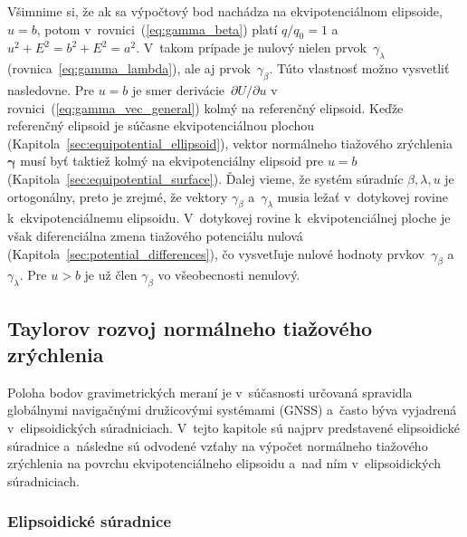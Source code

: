 \documentclass[a4paper, 12pt]{book}
\begin{document}
Všimnime si, že ak sa výpočtový bod nachádza na ekvipotenciálnom elipsoide, $u 
= b$, potom v~rovnici~(\ref{eq:gamma_beta}) platí $q \slash q_0 = 1$ a~$u^2 
+ E^2 = b^2 + E^2 = a^2$. V~takom prípade je nulový nielen 
prvok~$\gamma_\lambda$ (rovnica~\ref{eq:gamma_lambda}), ale aj 
prvok~$\gamma_\beta$.  Túto vlastnosť možno vysvetliť nasledovne.  Pre $u = b$ 
je smer derivácie~$\partial U \slash \partial u$ 
v rovnici~(\ref{eq:gamma_vec_general}) kolmý na referenčný elipsoid.  Keďže 
referenčný elipsoid je súčasne ekvipotenciálnou plochou 
(Kapitola~\ref{sec:equipotential_ellipsoid}), vektor normálneho tiažového 
zrýchlenia~$\boldsymbol \gamma$ musí byť taktiež kolmý na ekvipotenciálny 
elipsoid pre $u = b$ (Kapitola~\ref{sec:equipotential_surface}).  Ďalej vieme, 
že systém súradníc $\beta, \lambda, u$ je ortogonálny, preto je zrejmé, že 
vektory $\gamma_\beta$ a~$\gamma_\lambda$ musia ležať v~dotykovej rovine 
k~ekvipotenciálnemu elipsoidu.  V~dotykovej rovine k~ekvipotenciálnej ploche je 
však diferenciálna zmena tiažového potenciálu nulová 
(Kapitola~\ref{sec:potential_differences}), čo vysvetľuje nulové hodnoty 
prvkov~$\gamma_\beta$ a~$\gamma_\lambda$.  Pre $u > b$ je už člen 
$\gamma_\beta$ vo všeobecnosti nenulový.



\subsection{Taylorov rozvoj normálneho tiažového zrýchlenia}
\label{sec:normal_gravity_taylor}

Poloha bodov gravimetrických meraní je v~súčasnosti určovaná spravidla 
globálnymi navigačnými družicovými systémami (GNSS) a~často býva vyjadrená 
v~elipsoidických súradniciach.  V~tejto kapitole sú najprv predstavené 
elipsoidické súradnice a~následne sú odvodené vzťahy na výpočet normálneho 
tiažového zrýchlenia na povrchu ekvipotenciálneho elipsoidu a~nad ním 
v~elipsoidických súradniciach.

\subsubsection{Elipsoidické súradnice}
\end{document}
